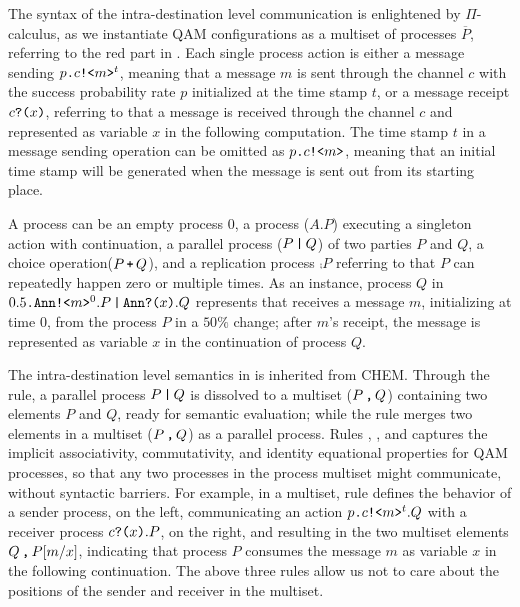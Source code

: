 The syntax of the intra-destination level communication is enlightened by $\Pi$-calculus, as we instantiate QAM configurations as a multiset of processes $\overline{P}$, referring to the red part in .
Each single process action is either a message sending $p\texttt{.}c\texttt{!<}m\texttt{>}^{t}$, meaning that a message $m$ is sent through the channel $c$ with the success probability rate $p$ initialized at the time stamp $t$, or a message receipt $c\texttt{?(}x\texttt{)}$, referring to that a message is received through the channel $c$ and represented as variable $x$ in the following computation.
The time stamp $t$ in a message sending operation can be omitted as $p\texttt{.}c\texttt{!<}m\texttt{>}$, meaning that an initial time stamp will be generated when the message is sent out from its starting place.

A process can be an empty process $0$, a process ($A.P$) executing a singleton action with continuation, a parallel process ($P\,\texttt{|}\,Q$) of two parties $P$ and $Q$, a choice operation($P\,\texttt{+}\,Q$), and a replication process $\comp{P}$ referring to that $P$ can repeatedly happen zero or multiple times. As an instance, process $Q$ in $0.5\texttt{.}\texttt{Ann}\texttt{!<}m\texttt{>}^0.P\,\texttt{|}\,\texttt{Ann}\texttt{?(}x\texttt{)}.Q$ represents that  receives a message $m$, initializing at time $0$, from the process $P$ in a $50\%$ change; after $m$'s receipt, the message is represented as variable $x$ in the continuation of process $Q$.

The intra-destination level semantics in  is inherited from CHEM.
Through the  rule, a parallel process $P\,\texttt{|}\,Q$ is dissolved to a multiset ($P\,\texttt{,}\,Q$) containing two elements $P$ and $Q$, ready for semantic evaluation; while the  rule merges two elements in a multiset ($P\,\texttt{,}\,Q$) as a parallel process. Rules , , and  captures the implicit associativity, commutativity, and identity equational properties for QAM processes, so that any two processes in the process multiset might communicate, without syntactic barriers. For example, in a multiset, rule  defines the behavior of a sender process, on the left, communicating an action $p\texttt{.}c\texttt{!<}m\texttt{>}^t.Q$ with a receiver process $c\texttt{?(}x\texttt{)}.P$, on the right, and resulting in the two multiset elements $Q\,\texttt{,}\,P[m/x]$, indicating that process $P$ consumes the message $m$ as variable $x$ in the following continuation. The above three rules allow us not to care about the positions of the sender and receiver in the multiset.

